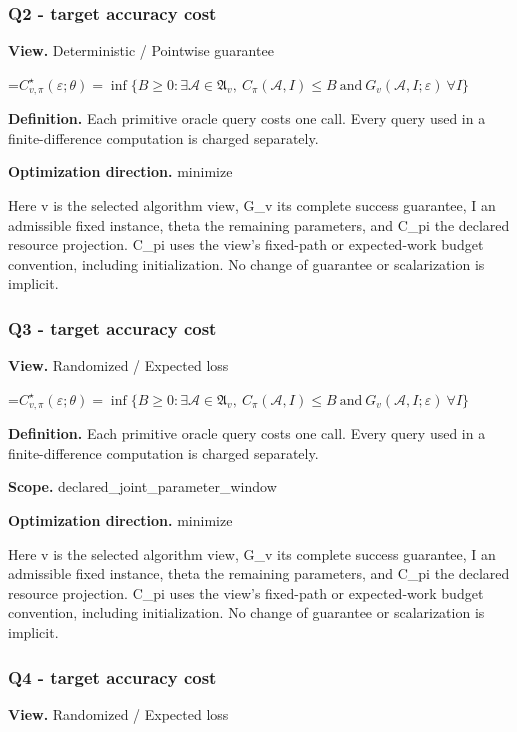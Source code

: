 \documentclass[10pt,a4paper]{article}
\newcommand{\AtlasMath}[1]{\par\begingroup\centering\setbox0=\hbox{$\displaystyle #1$}\ifdim\wd0>1.4\linewidth\typeout{ATLAS WIDE FORMULA: \the\wd0}\fi\ifdim\wd0>\linewidth\resizebox{\linewidth}{!}{\box0}\else\box0\fi\par\endgroup}
\begin{document}
\subsubsection{Q2 - target accuracy cost}
\textbf{View.} Deterministic / Pointwise guarantee

\AtlasMath{C^\star_{v,\pi}(\varepsilon;\theta)=\inf\{B\ge0:\exists\mathcal A\in\mathfrak A_v,\ C_\pi(\mathcal A,I)\le B\ \text{and}\ G_v(\mathcal A,I;\varepsilon)\ \forall I\}}
\textbf{Definition.} Each primitive oracle query costs one call. Every query used in a finite-difference computation is charged separately.

\textbf{Optimization direction.} minimize

Here v is the selected algorithm view, G\_v its complete success guarantee, I an admissible fixed instance, theta the remaining parameters, and C\_pi the declared resource projection. C\_pi uses the view's fixed-path or expected-work budget convention, including initialization. No change of guarantee or scalarization is implicit.

\subsubsection{Q3 - target accuracy cost}
\textbf{View.} Randomized / Expected loss

\AtlasMath{C^\star_{v,\pi}(\varepsilon;\theta)=\inf\{B\ge0:\exists\mathcal A\in\mathfrak A_v,\ C_\pi(\mathcal A,I)\le B\ \text{and}\ G_v(\mathcal A,I;\varepsilon)\ \forall I\}}
\textbf{Definition.} Each primitive oracle query costs one call. Every query used in a finite-difference computation is charged separately.

\textbf{Scope.} declared\_joint\_parameter\_window

\textbf{Optimization direction.} minimize

Here v is the selected algorithm view, G\_v its complete success guarantee, I an admissible fixed instance, theta the remaining parameters, and C\_pi the declared resource projection. C\_pi uses the view's fixed-path or expected-work budget convention, including initialization. No change of guarantee or scalarization is implicit.

\subsubsection{Q4 - target accuracy cost}
\textbf{View.} Randomized / Expected loss
\end{document}
